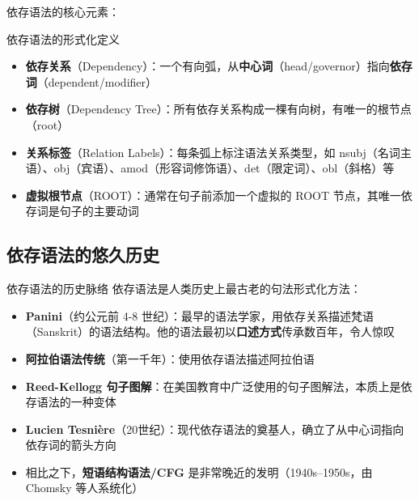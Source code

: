 \documentclass[a4paper]{article}
\begin{document}



依存语法的核心元素：

\begin{importantbox}{依存语法的形式化定义}
\begin{itemize}
    \item \textbf{依存关系}（Dependency）：一个有向弧，从\textbf{中心词}（head/governor）指向\textbf{依存词}（dependent/modifier）
    \item \textbf{依存树}（Dependency Tree）：所有依存关系构成一棵有向树，有唯一的根节点（root）
    \item \textbf{关系标签}（Relation Labels）：每条弧上标注语法关系类型，如 nsubj（名词主语）、obj（宾语）、amod（形容词修饰语）、det（限定词）、obl（斜格）等
    \item \textbf{虚拟根节点}（ROOT）：通常在句子前添加一个虚拟的 ROOT 节点，其唯一依存词是句子的主要动词
\end{itemize}
\end{importantbox}





\subsection{依存语法的悠久历史}





\begin{knowledgebox}{依存语法的历史脉络}
依存语法是人类历史上最古老的句法形式化方法：
\begin{itemize}
    \item \textbf{Panini}（约公元前 4-8 世纪）：最早的语法学家，用依存关系描述梵语（Sanskrit）的语法结构。他的语法最初以\textbf{口述方式}传承数百年，令人惊叹
    \item \textbf{阿拉伯语法传统}（第一千年）：使用依存语法描述阿拉伯语
    \item \textbf{Reed-Kellogg 句子图解}：在美国教育中广泛使用的句子图解法，本质上是依存语法的一种变体
    \item \textbf{Lucien Tesni\`ere}（20世纪）：现代依存语法的奠基人，确立了从中心词指向依存词的箭头方向
    \item 相比之下，\textbf{短语结构语法/CFG} 是非常晚近的发明（1940s--1950s，由 Chomsky 等人系统化）
\end{itemize}
\end{knowledgebox}
\end{document}
